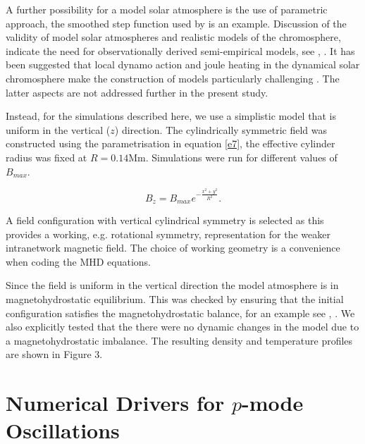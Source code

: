 \documentclass[physics,article,submit,pdftex,moreauthors]{Definitions/mdpi}
\begin{document}
A further possibility for a model solar atmosphere is the use of parametric approach, the smoothed step function used by \cite{Murawski2010} is an example. Discussion of the validity of model solar atmospheres and realistic models of the chromosphere,  indicate the need for observationally derived semi-empirical models, see \cite{Carlsson1995}, \cite{Kalkofen2012}. It has been suggested that local dynamo action and joule heating in the dynamical solar chromosphere make the construction of models particularly challenging \cite{Leenaarts2011}. The latter aspects are not addressed further in the present study.


Instead, for the simulations described here, we use a simplistic model  that is uniform in the vertical ($z$) direction. The cylindrically symmetric field was constructed using  the parametrisation in equation \ref{e7}, the effective cylinder radius was fixed at $R=0.14$Mm. Simulations were run for different values of $B_{max}$.

\begin{equation}
B_{z}=B_{max} e^{-\frac{x^2+y^2}{R^2}}. \label{e7}
\end{equation}

A field configuration with vertical cylindrical symmetry is selected as this provides a working, e.g. rotational symmetry, representation for  the weaker intranetwork magnetic field. The choice of working geometry is a convenience when coding the MHD equations.

Since the field is uniform in the vertical direction the model atmosphere is in magnetohydrostatic equilibrium. This was checked by ensuring that the initial configuration satisfies the magnetohydrostatic balance, for an example see \cite{Schussler2005}, \cite{Gent2013}. We also explicitly tested that the there were no dynamic changes in the model due to a magnetohydrostatic imbalance. The resulting density and temperature profiles are shown in Figure 3. 


\section{Numerical Drivers for $p$-mode Oscillations}
\end{document}
